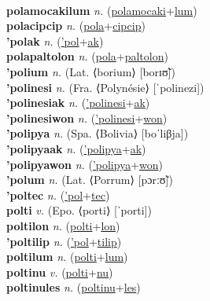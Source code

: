  \label{polamocakiles} \\
\textbf{polamocakilum} \textit{n.} (\hyperref[polamocaki]{polamocaki}+\hyperref[lum]{lum})
 \label{polamocakilum} \\
\textbf{polacipcip} \textit{n.} (\hyperref[pola]{pola}+\hyperref[cipcip]{cipcip})
 \label{polacipcip} \\
\textbf{'polak} \textit{n.} (\hyperref['pol]{'pol}+\hyperref[ak]{ak})
 \label{'polak} \\
\textbf{polapaltolon} \textit{n.} (\hyperref[pola]{pola}+\hyperref[paltolon]{paltolon})
 \label{polapaltolon} \\
\textbf{'polium} \textit{n.} (Lat. ⟨borium⟩ [borɪʊ̃])
 \label{'polium} \\
\textbf{'polinesi} \textit{n.} (Fra. ⟨Polynésie⟩ [ˈpolinezi])
 \label{'polinesi} \\
\textbf{'polinesiak} \textit{n.} (\hyperref['polinesi]{'polinesi}+\hyperref[ak]{ak})
 \label{'polinesiak} \\
\textbf{'polinesiwon} \textit{n.} (\hyperref['polinesi]{'polinesi}+\hyperref[won]{won})
 \label{'polinesiwon} \\
\textbf{'polipya} \textit{n.} (Spa. ⟨Bolivia⟩ [boˈliβja])
 \label{'polipya} \\
\textbf{'polipyaak} \textit{n.} (\hyperref['polipya]{'polipya}+\hyperref[ak]{ak})
 \label{'polipyaak} \\
\textbf{'polipyawon} \textit{n.} (\hyperref['polipya]{'polipya}+\hyperref[won]{won})
 \label{'polipyawon} \\
\textbf{'polum} \textit{n.} (Lat. ⟨Porrum⟩ [pɔrːʊ̃])
 \label{'polum} \\
\textbf{'poltec} \textit{n.} (\hyperref['pol]{'pol}+\hyperref[tec]{tec})
 \label{'poltec} \\
\textbf{polti} \textit{v.} (Epo. ⟨porti⟩ [ˈporti])
 \label{polti} \\
\textbf{poltilon} \textit{n.} (\hyperref[polti]{polti}+\hyperref[lon]{lon})
 \label{poltilon} \\
\textbf{'poltilip} \textit{n.} (\hyperref['pol]{'pol}+\hyperref[tilip]{tilip})
 \label{'poltilip} \\
\textbf{poltilum} \textit{n.} (\hyperref[polti]{polti}+\hyperref[lum]{lum})
 \label{poltilum} \\
\textbf{poltinu} \textit{v.} (\hyperref[polti]{polti}+\hyperref[nu]{nu})
 \label{poltinu} \\
\textbf{poltinules} \textit{n.} (\hyperref[poltinu]{poltinu}+\hyperref[les]{les})
 \label{poltinules} \\
